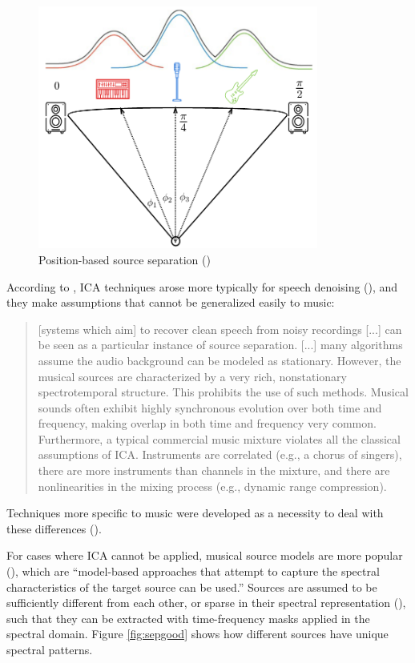 \documentclass[report.tex]{subfiles}
\begin{document}
\begin{figure}[ht]
	\centering
	\includegraphics[height=8cm]{./images-mss/positional.png}
	\caption{Position-based source separation (\cite{musicsepgood})}
\label{fig:icaposition}
\end{figure}

According to \textcite{musicsepintro1}, ICA techniques arose more typically for speech denoising (\cite{speechsep}), and they make assumptions that cannot be generalized easily to music:

\begin{quote}
	[systems which aim] to recover clean speech from noisy recordings [...] can be seen as a particular instance of source separation. [...] many algorithms assume the audio background can be modeled as stationary. However, the musical sources are characterized by a very rich, nonstationary spectrotemporal structure. This prohibits the use of such methods. Musical sounds often exhibit highly synchronous evolution over both time and frequency, making overlap in both time and frequency very common. Furthermore, a typical commercial music mixture violates all the classical assumptions of ICA. Instruments are correlated (e.g., a chorus of singers), there are more instruments than channels in the mixture, and there are nonlinearities in the mixing process (e.g., dynamic range compression).
\end{quote}

Techniques more specific to music were developed as a necessity to deal with these differences (\cite{musicseptechniques1, musicseptechniques2}).

For cases where ICA cannot be applied, musical source models are more popular (\cite{musicsepgood}), which are ``model-based approaches that attempt to capture the spectral characteristics of the target source can be used.'' Sources are assumed to be sufficiently different from each other, or sparse in their spectral representation (\cite{musicsepgood}), such that they can be extracted with time-frequency masks applied in the spectral domain. Figure \ref{fig:sepgood} shows how different sources have unique spectral patterns.
\end{document}
